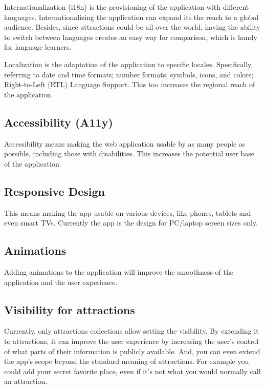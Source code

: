 \par Internationalization (i18n) is the provisioning of the application with different languages. Internationalizing the application can expand its the reach to a global audience. Besides, since attractions could be all over the world, having the ability to switch between languages creates an easy way for comparison, which is handy for language learners.

\par Localization is the adaptation of the application to specific locales. Specifically, referring to date and time formats; number formats; symbols, icons, and colors; Right-to-Left (RTL) Language Support. This too increases the regional reach of the application.

\subsection{Accessibility (A11y)}

\par Accessibility means making the web application usable by as many people as possible, including those with disabilities. This increases the potential user base of the application.

\subsection{Responsive Design} 

\par This means making the app usable on various devices, like phones, tablets and even smart TVs. Currently the app is the design for PC/laptop screen sizes only. 

\subsection{Animations}

\par Adding animations to the application will improve the smoothness of the application and the user experience.

\subsection{Visibility for attractions}

\par Currently, only attractions collections allow setting the visibility. By extending it to attractions, it can improve the user experience by increasing the user's control of what parts of their information is publicly available. And, you can even extend the app's scope beyond the standard meaning of attractions. For example you could add your secret favorite place, even if it's not what you would normally call an attraction.

